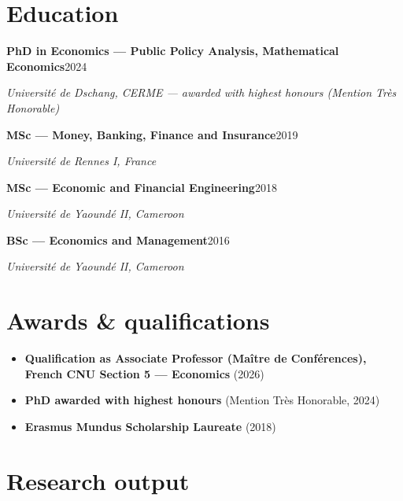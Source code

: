 \documentclass[
  french,
  10pt,
  letterpaper,
  DIV=11,
  numbers=noendperiod]{scrartcl}
\providecommand{\tightlist}{%
  \setlength{\itemsep}{0pt}\setlength{\parskip}{0pt}}
\newcommand{\posteitem}[2]{\noindent\textbf{#1}\hfill{\color{softgray}\small #2}\par}
\begin{document}
\section{Education}\label{education}

\hspace{1em}\posteitem{PhD in Economics — Public Policy Analysis, Mathematical Economics}{2024}

\textit{Université de Dschang, CERME — awarded with highest honours (Mention Très Honorable)}

\hspace{1em}\posteitem{MSc — Money, Banking, Finance and Insurance}{2019}

\textit{Université de Rennes I, France}

\hspace{1em}\posteitem{MSc — Economic and Financial Engineering}{2018}

\textit{Université de Yaoundé II, Cameroon}

\hspace{1em}\posteitem{BSc — Economics and Management}{2016}

\textit{Université de Yaoundé II, Cameroon}

\section{Awards \& qualifications}\label{awards-qualifications}

\begin{itemize}
\tightlist
\item
  \textbf{Qualification as Associate Professor (Maître de Conférences),
  French CNU Section 5 --- Economics} (2026)
\item
  \textbf{PhD awarded with highest honours} (Mention Très Honorable,
  2024)
\item
  \textbf{Erasmus Mundus Scholarship Laureate} (2018)
\end{itemize}

\newpage

\section{Research output}\label{research-output}

\vspace{-2pt}
\end{document}
